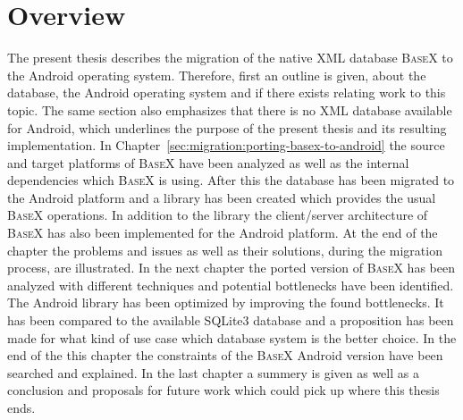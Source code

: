 \section{Overview}
\label{sec:overview}
The present thesis describes the migration of the native XML database \textsc{BaseX} to the Android operating system.
Therefore, first an outline is given, about the database, the Android operating system and if there exists relating work to this topic.
The same section also emphasizes that there is no XML database available for Android, which underlines the purpose of the present thesis and its resulting implementation.
In Chapter~\ref{sec:migration:porting-basex-to-android} the source and target platforms of \textsc{BaseX} have been analyzed as well as the internal dependencies which \textsc{BaseX} is using.
After this the database has been migrated to the Android platform and a library has been created which provides the usual \textsc{BaseX} operations.
In addition to the library the client/server architecture of \textsc{BaseX} has also been implemented for the Android platform.
At the end of the chapter the problems and issues as well as their solutions, during the migration process, are illustrated.
In the next chapter the ported version of \textsc{BaseX} has been analyzed with different techniques and potential bottlenecks have been identified.
The Android library has been optimized by improving the found bottlenecks.
It has been compared to the available SQLite3 database and a proposition has been made for what kind of use case which database system is the better choice.
In the end of the this chapter the constraints of the \textsc{BaseX} Android version have been searched and explained.
In the last chapter a summery is given as well as a conclusion and proposals for future work which could pick up where this thesis ends.


